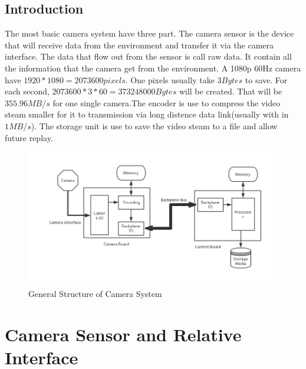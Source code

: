 \documentclass[12pt,article]{memoir}
\begin{document}
\section{Introduction}
The most basic camera system have three part. The camera sensor is the device that will receive data from the environment and transfer it via the camera interface. The data that flow out from the sensor is call raw data. It contain all the information that the camera get from the environment. A 1080p 60Hz camera have $1920*1080=2073600 pixels$. One pixels usually take $3 Bytes$ to save. For each second, $2073600*3*60=373248000Bytes$ will be created. That will be $355.96MB/s$ for one single camera.The encoder is use to compress the video steam smaller for it to transmission via long distence data link(usually with in $1MB/s$). The storage unit is use to save the video steam to a file and allow future replay.
\begin{figure}[htp]
\includegraphics[width=\textwidth]{img/DR00002_GenDia.png}
 \caption{General Structure of Camera System}	
\end{figure}
\newpage
%
\chapter{Camera Sensor and Relative Interface}
\end{document}

